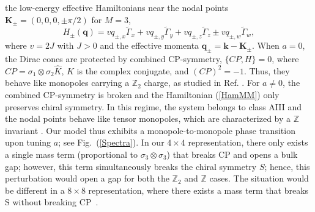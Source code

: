 \documentclass[twocolumn,prl,10pt,superscriptaddress]{revtex4}
\begin{document}
the low-energy effective Hamiltonians near the nodal points ${\boldsymbol K}_{\pm}= (0,0,0,\pm \pi/2)$ for $M=3$,
\begin{equation}\label{Ham_Mp}
H_{\pm}({\boldsymbol q})=v q_{\pm,x}\tilde{\Gamma}_x+v q_{\pm,y}\tilde{\Gamma}_y+v q_{\pm,z}\tilde{\Gamma}_z\pm v q_{\pm,w}\tilde{\Gamma}_w,
\end{equation}
where $v=2J$ with $J>0$ and the effective momenta ${\boldsymbol q}_\pm={\boldsymbol k}-{\boldsymbol K}_{\pm}$.
When $a\!=\!0$, the Dirac cones are protected by combined CP-symmetry, $\{CP,H\}=0$, where $CP=\sigma_1\otimes\sigma_2\hat{K}$,  $\hat{K}$ is the complex conjugate, and $(CP)^2=-1$. Thus, they behave like monopoles carrying a $\mathbb{Z}_2$ charge, as studied in Ref. \cite{YXZhao2016}. For $a\neq0$, the combined CP-symmetry is broken and the Hamiltonian (\ref{HamMM}) only preserves chiral symmetry. In this regime, the system belongs to class AIII and the nodal points behave like tensor monopoles, which are characterized by a $\mathbb{Z}$ invariant \cite{Palumbo2018,Palumbo2019}. Our model thus exhibits a monopole-to-monopole phase transition upon tuning $a$; see Fig.~(\ref{Spectra}). In our $4\!\times\!4$ representation, there only exists a single mass term (proportional to $\sigma_3 \otimes \sigma_3$) that breaks CP and opens a bulk gap; however, this term simultaneously breaks the chiral symmetry $S$; hence, this perturbation would open a gap for both the $\mathbb{Z}_2$ and $\mathbb{Z}$ cases. The situation would be different in a $8\!\times\!8$ representation, where there exists a mass term that breaks S without breaking CP~\cite{SM}.
\end{document}
